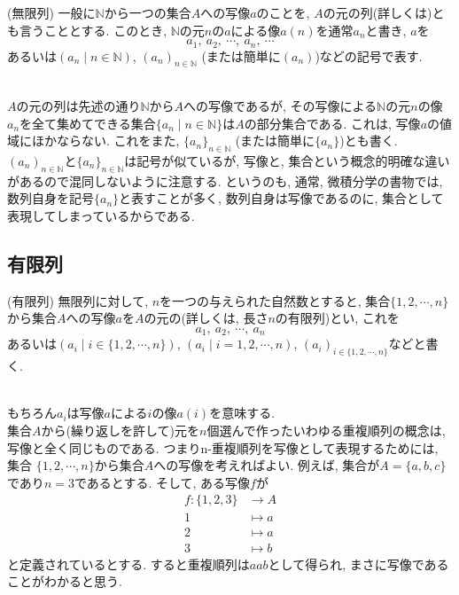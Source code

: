 \documentclass[a4j]{jsarticle}
\begin{document}
\begin{itembox}[l]{ (無限列)}
	一般に$\mathbb{N}$から一つの集合$A$への写像$a$のことを, $A$の元の列(詳しくは)とも言うこととする. このとき, $\mathbb{N}$の元$n$の$a$による像$a(n)$を通常$a_n$と書き, $a$を$$ a_1,\:a_2,\:\cdots,\:a_n,\:\cdots $$あるいは$(a_n \mid n \in \mathbb{N})$, $(a_n)_{n \in \mathbb{N}}$ (または簡単に$(a_n)$)などの記号で表す.
\end{itembox}\\

$A$の元の列は先述の通り$\mathbb{N}$から$A$への写像であるが, その写像による$\mathbb{N}$の元$n$の像$a_n$を全て集めてできる集合$\{a_n \mid n \in \mathbb{N}\}$は$A$の部分集合である. これは, 写像$a$の値域にほかならない. これをまた, $\{a_n\}_{n \in \mathbb{N}}$ (または簡単に$\{a_n\}$)とも書く. \\

 $(a_n)_{n \in \mathbb{N}}$と$\{a_n\}_{n \in \mathbb{N}}$は記号が似ているが, 写像と, 集合という概念的明確な違いがあるので混同しないように注意する. というのも, 通常, 微積分学の書物では, 数列自身を記号$\{a_n\}$と表すことが多く, 数列自身は写像であるのに, 集合として表現してしまっているからである.

\subsection{有限列}

\begin{itembox}[l]{ (有限列)}
	無限列に対して, $n$を一つの与えられた自然数とすると, 集合$\{1,2,\cdots,n\}$から集合$A$への写像$a$を$A$の元の(詳しくは, 長さ$n$の有限列)とい, これを$$ a_1,\:a_2,\:\cdots,\:a_n$$あるいは$(a_i \mid i \in \{1,2,\cdots,n\})$, $(a_i \mid i = 1,2,\cdots,n)$, $(a_i)_{i \in \{1,2,\cdots,n\}}$などと書く.
\end{itembox}\\

もちろん$a_i$は写像$a$による$i$の像$a(i)$を意味する. \\

 集合$A$から(繰り返しを許して)元を$n$個選んで作ったいわゆる重複順列の概念は, 写像と全く同じものである. つまりn-重複順列を写像として表現するためには, 集合
$\{1,2,\cdots,n\}$から集合$A$への写像を考えればよい. 例えば, 集合が$A=\{a,b,c\}$であり$n=3$であるとする. そして, ある写像$f$が
\begin{align*}
	f : \{1,2,3\} & \rightarrow A \\
	1             & \mapsto a     \\
	2             & \mapsto a     \\
	3             & \mapsto b
\end{align*}
と定義されているとする. すると重複順列は$aab$として得られ, まさに写像であることがわかると思う.
\end{document}
